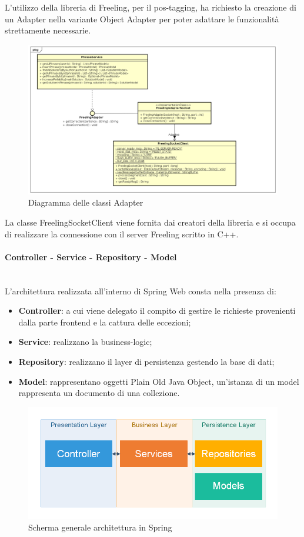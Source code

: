 L'utilizzo della libreria di Freeling, per il pos-tagging, ha richiesto la creazione di un Adapter nella variante Object Adapter per poter adattare le funzionalità strettamente necessarie.
\begin{figure}[H]
\includegraphics[width=17cm]{img/Adapter.png} 
\caption{Diagramma delle classi Adapter}
\end{figure}
La classe FreelingSocketClient viene fornita dai creatori della libreria e si occupa di realizzare la connessione con il server Freeling scritto in C++.
\paragraph{Controller - Service - Repository - Model}\mbox{}\\

L'architettura realizzata all'interno di Spring Web consta nella presenza di:
\begin{itemize}
\item \textbf{Controller}: a cui viene delegato il compito di gestire le richieste provenienti dalla parte frontend e la cattura delle eccezioni;
\item \textbf{Service}: realizzano la business-logic;
\item \textbf{Repository}: realizzano il layer di persistenza gestendo la base di dati;
\item \textbf{Model}: rappresentano oggetti  Plain Old Java Object, un'istanza di un model rappresenta un documento di una collezione.
\end{itemize}
\begin{figure}[H]
\centering
\includegraphics[width=14cm]{img/springArch.png}
\caption{Scherma generale architettura in Spring}
\end{figure}

